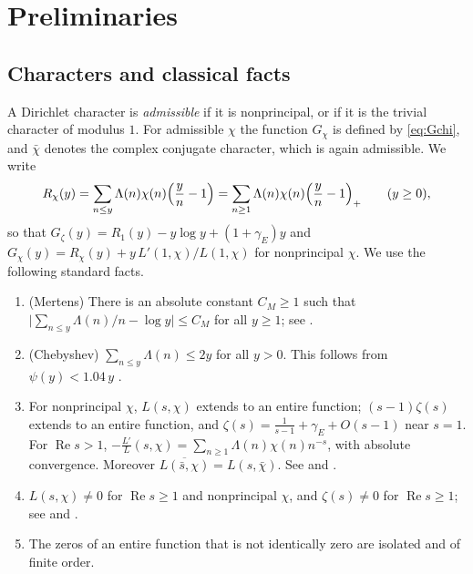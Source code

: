 \documentclass[11pt]{amsart}
\newcommand{\re}{\operatorname{Re}}
\newcommand{\gE}{\gamma_{E}}
\theoremstyle{plain}
\theoremstyle{definition}
\numberwithin{equation}{section}
\begin{document}
\section{Preliminaries}\label{sec:prelim}

\subsection{Characters and classical facts}

A Dirichlet character is \emph{admissible} if it is nonprincipal, or if it is the trivial
character of modulus $1$. For admissible $\chi$ the function $G_\chi$ is defined by
\eqref{eq:Gchi}, and $\bar\chi$ denotes the complex conjugate character, which is again
admissible. We write
\[
R_\chi(y)=\sum_{n\le y}\Lambda(n)\chi(n)\Bigl(\frac yn-1\Bigr)=\sum_{n\ge1}\Lambda(n)\chi(n)\Bigl(\frac yn-1\Bigr)_{+}
\qquad(y\ge0),
\]
so that $G_\zeta(y)=R_1(y)-y\log y+(1+\gE)y$ and $G_\chi(y)=R_\chi(y)+y\,L'(1,\chi)/L(1,\chi)$ for
nonprincipal $\chi$. We use the following standard facts.

\begin{enumerate}[label=\textbf{(F\arabic*)}, leftmargin=3.2em]
\item\label{F1} (Mertens) There is an absolute constant $C_M\ge1$ such that
  $\bigl|\sum_{n\le y}\Lambda(n)/n-\log y\bigr|\le C_M$ for all $y\ge1$; see
  \cite[Section~2.2]{montgomery-vaughan}.
\item\label{F2} (Chebyshev) $\sum_{n\le y}\Lambda(n)\le 2y$ for all $y>0$. This follows from
  $\psi(y)<1.04\,y$ \cite[Theorem~12]{rosser-schoenfeld}.
\item\label{F3} For nonprincipal $\chi$, $L(s,\chi)$ extends to an entire function; $(s-1)\zeta(s)$
  extends to an entire function, and $\zeta(s)=\frac1{s-1}+\gE+O(s-1)$ near $s=1$. For
  $\re s>1$, $-\frac{L'}{L}(s,\chi)=\sum_{n\ge1}\Lambda(n)\chi(n)n^{-s}$, with absolute convergence.
  Moreover $\overline{L(\bar s,\chi)}=L(s,\bar\chi)$. See \cite[Chapter~10]{montgomery-vaughan} and
  \cite{davenport}.
\item\label{F4} $L(s,\chi)\neq0$ for $\re s\ge1$ and nonprincipal $\chi$, and $\zeta(s)\neq0$ for
  $\re s\ge1$; see \cite[Chapters~6 and~11]{montgomery-vaughan} and \cite{davenport}.
\item\label{F5} The zeros of an entire function that is not identically zero are isolated and of
  finite order.
\end{enumerate}
\end{document}
